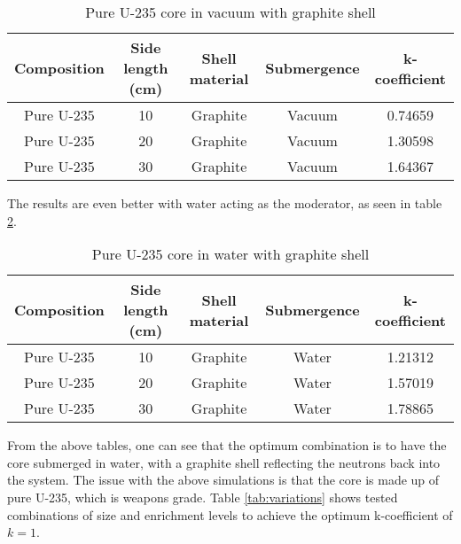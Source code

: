 \begin{table}[!htbp]
\centering
\caption{Pure U-235 core in vacuum with graphite shell}
\label{tab:puregraphite}
\begin{tabular}{|c|c|c|c|c|}
\hline
Composition & Side length (cm) & Shell material & Submergence & k-coefficient \\
\hline
Pure U-235  & 10               & Graphite            & Vacuum       & 0.74659      \\
\hline
Pure U-235  & 20               & Graphite            & Vacuum       & 1.30598       \\
\hline
Pure U-235  & 30               & Graphite            & Vacuum       & 1.64367       \\
\hline
\end{tabular}
\end{table}

The results are even better with water acting as the moderator, as seen in table \ref{tab:puregraphitew}.

\begin{table}[!htbp]
\centering
\caption{Pure U-235 core in water with graphite shell}
\label{tab:puregraphitew}
\begin{tabular}{|c|c|c|c|c|}
\hline
Composition & Side length (cm) & Shell material & Submergence & k-coefficient \\
\hline
Pure U-235  & 10               & Graphite            & Water       & 1.21312      \\
\hline
Pure U-235  & 20               & Graphite            & Water       & 1.57019       \\
\hline
Pure U-235  & 30               & Graphite            & Water       & 1.78865       \\
\hline
\end{tabular}
\end{table}

From the above tables, one can see that the optimum combination is to have the core submerged in water, with a graphite shell reflecting the neutrons back into the system. The issue with the above simulations is that the core is made up of pure U-235, which is weapons grade. Table \ref{tab:variations} shows tested combinations of size and enrichment levels to achieve the optimum k-coefficient of $k=1$.

